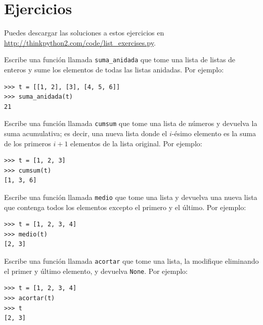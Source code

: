 \documentclass[10pt]{book}
\begin{document}
\section{Ejercicios}

Puedes descargar las soluciones a estos ejercicios en
\url{http://thinkpython2.com/code/list_exercises.py}.

\begin{exercise}

Escribe una función llamada \verb"suma_anidada" que tome una lista de listas
de enteros y sume los elementos de todas las listas anidadas.
Por ejemplo:

\begin{verbatim}
>>> t = [[1, 2], [3], [4, 5, 6]]
>>> suma_anidada(t)
21
\end{verbatim}

\end{exercise}

\begin{exercise}
\label{cumulative}

Escribe una función llamada {\tt cumsum} que tome una lista de números y
devuelva la suma acumulativa; es decir, una nueva lista donde el $i$-ésimo
elemento es la suma de los primeros $i+1$ elementos de la lista original.
Por ejemplo:

\begin{verbatim}
>>> t = [1, 2, 3]
>>> cumsum(t)
[1, 3, 6]
\end{verbatim}

\end{exercise}

\begin{exercise}

Escribe una función llamada \verb"medio" que tome una lista y
devuelva una nueva lista que contenga todos los elementos excepto el primero
y el último.  Por ejemplo:

\begin{verbatim}
>>> t = [1, 2, 3, 4]
>>> medio(t)
[2, 3]
\end{verbatim}

\end{exercise}

\begin{exercise}

Escribe una función llamada \verb"acortar" que tome una lista, la modifique
eliminando el primer y último elemento, y devuelva {\tt None}.
Por ejemplo:

\begin{verbatim}
>>> t = [1, 2, 3, 4]
>>> acortar(t)
>>> t
[2, 3]
\end{verbatim}

\end{exercise}
\end{document}
